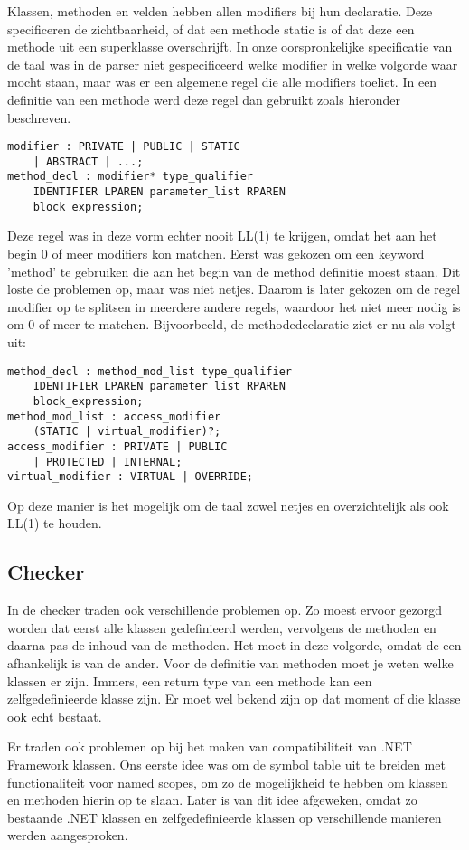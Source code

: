 Klassen, methoden en velden hebben allen modifiers bij hun declaratie. Deze specificeren de zichtbaarheid, of dat een methode static is of dat deze een methode uit een superklasse overschrijft. In onze oorspronkelijke specificatie van de taal was in de parser niet gespecificeerd welke modifier in welke volgorde waar mocht staan, maar was er een algemene regel die alle modifiers toeliet. In een definitie van een methode werd deze regel dan gebruikt zoals hieronder beschreven.
\begin{lstlisting}	
modifier : PRIVATE | PUBLIC | STATIC
	| ABSTRACT | ...;
method_decl : modifier* type_qualifier
	IDENTIFIER LPAREN parameter_list RPAREN
	block_expression;
\end{lstlisting}
Deze regel was in deze vorm echter nooit LL(1) te krijgen, omdat het aan het begin 0 of meer modifiers kon matchen. Eerst was gekozen om een keyword 'method' te gebruiken die aan het begin van de method definitie moest staan. Dit loste de problemen op, maar was niet netjes. Daarom is later gekozen om de regel modifier op te splitsen in meerdere andere regels, waardoor het niet meer nodig is om 0 of meer te matchen. Bijvoorbeeld, de methodedeclaratie ziet er nu als volgt uit:
\begin{lstlisting}
method_decl : method_mod_list type_qualifier
	IDENTIFIER LPAREN parameter_list RPAREN
	block_expression;
method_mod_list : access_modifier
	(STATIC | virtual_modifier)?;
access_modifier : PRIVATE | PUBLIC
	| PROTECTED | INTERNAL;
virtual_modifier : VIRTUAL | OVERRIDE;
\end{lstlisting}	
Op deze manier is het mogelijk om de taal zowel netjes en overzichtelijk als ook LL(1) te houden.

\subsection{Checker}
In de checker traden ook verschillende problemen op. Zo moest ervoor gezorgd worden dat eerst alle klassen gedefinieerd werden, vervolgens de methoden en daarna pas de inhoud van de methoden. Het moet in deze volgorde, omdat de een afhankelijk is van de ander. Voor de definitie van methoden moet je weten welke klassen er zijn. Immers, een return type van een methode kan een zelfgedefinieerde klasse zijn. Er moet wel bekend zijn op dat moment of die klasse ook echt bestaat.

Er traden ook problemen op bij het maken van compatibiliteit van .NET Framework klassen. Ons eerste idee was om de symbol table uit te breiden met functionaliteit voor named scopes, om zo de mogelijkheid te hebben om klassen en methoden hierin op te slaan. Later is van dit idee afgeweken, omdat zo bestaande .NET klassen en zelfgedefinieerde klassen op verschillende manieren werden aangesproken.

